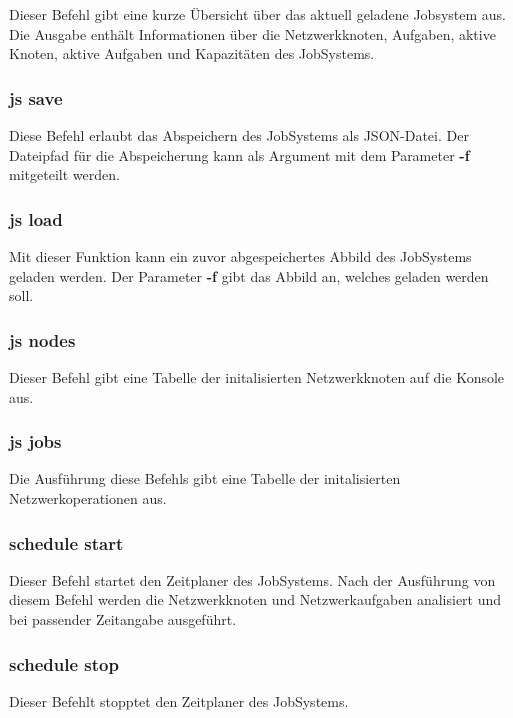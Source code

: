 \documentclass[12pt,a4paper]{report}
\begin{document}
Dieser Befehl gibt eine kurze Übersicht über das aktuell geladene Jobsystem aus. Die Ausgabe enthält Informationen über die Netzwerkknoten, Aufgaben, aktive Knoten, aktive Aufgaben und Kapazitäten des JobSystems.

\subsubsection{js save}

Diese Befehl erlaubt das Abspeichern des JobSystems als JSON-Datei. Der Dateipfad für die Abspeicherung kann als Argument mit dem Parameter \textbf{-f} mitgeteilt werden.

\subsubsection{js load}

Mit dieser Funktion kann ein zuvor abgespeichertes Abbild des JobSystems geladen werden. Der Parameter \textbf{-f} gibt das Abbild an, welches geladen werden soll.

\subsubsection{js nodes}

Dieser Befehl gibt eine Tabelle der initalisierten Netzwerkknoten auf die Konsole aus.

\subsubsection{js jobs}

Die Ausführung diese Befehls gibt eine Tabelle der initalisierten Netzwerkoperationen aus.

\subsubsection{schedule start}

Dieser Befehl startet den Zeitplaner des JobSystems. Nach der Ausführung von diesem Befehl werden die Netzwerkknoten und Netzwerkaufgaben analisiert und bei passender Zeitangabe ausgeführt.

\subsubsection{schedule stop}

Dieser Befehlt stopptet den Zeitplaner des JobSystems.
\end{document}
